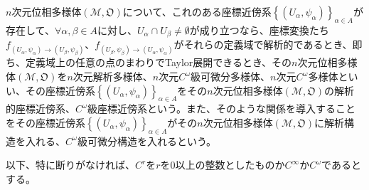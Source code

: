\documentclass[dvipdfmx]{jsarticle}
\begin{document}
\begin{dfn}
$n$次元位相多様体$\left( \mathcal{M},\mathfrak{O} \right)$について、これのある座標近傍系$\left\{ \left( U_{\alpha},\psi_{\alpha} \right) \right\}_{\alpha \in A}$が存在して、$\forall\alpha,\beta \in A$に対し、$U_{\alpha} \cap U_{\beta} \neq \emptyset$が成り立つなら、座標変換たち$f_{\left( U_{\alpha},\psi_{\alpha} \right) \rightarrow \left( U_{\beta},\psi_{\beta} \right)}$、$f_{\left( U_{\beta},\psi_{\beta} \right) \rightarrow \left( U_{\alpha},\psi_{\alpha} \right)}$がそれらの定義域で解析的であるとき、即ち、定義域上の任意の点のまわりでTaylor展開できるとき、その$n$次元位相多様体$\left( \mathcal{M},\mathfrak{O} \right)$を$n$次元解析多様体、$n$次元$C^{\omega}$級可微分多様体、$n$次元$C^{\omega}$多様体といい、その座標近傍系$\left\{ \left( U_{\alpha},\psi_{\alpha} \right) \right\}_{\alpha \in A}$をその$n$次元位相多様体$\left( \mathcal{M},\mathfrak{O} \right)$の解析的座標近傍系、$C^{\omega}$級座標近傍系という。また、そのような関係を導入することをその座標近傍系$\left\{ \left( U_{\alpha},\psi_{\alpha} \right) \right\}_{\alpha \in A}$がその$n$次元位相多様体$\left( \mathcal{M},\mathfrak{O} \right)$に解析構造を入れる、$C^{\omega}$級可微分構造を入れるという。
\end{dfn}\par
以下、特に断りがなければ、$C^{r}$を$r$を$0$以上の整数としたものか$C^{\infty}$か$C^{\omega}$であるとする。
\end{document}

